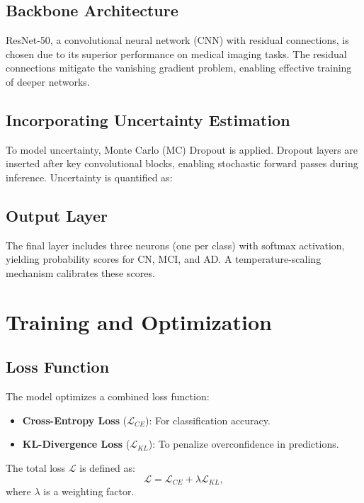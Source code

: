 \documentclass[12pt,twocolumn]{report}
\begin{document}
\subsection{Backbone Architecture}
ResNet-50, a convolutional neural network (CNN) with residual connections, is chosen due to its superior performance on medical imaging tasks. The residual connections mitigate the vanishing gradient problem, enabling effective training of deeper networks.

\subsection{Incorporating Uncertainty Estimation}
To model uncertainty, Monte Carlo (MC) Dropout is applied. Dropout layers are inserted after key convolutional blocks, enabling stochastic forward passes during inference. Uncertainty is quantified as:

\subsection{Output Layer}
The final layer includes three neurons (one per class) with softmax activation, yielding probability scores for CN, MCI, and AD. A temperature-scaling mechanism calibrates these scores.

\section{Training and Optimization}

\subsection{Loss Function}
The model optimizes a combined loss function:
\begin{itemize}
    \item \textbf{Cross-Entropy Loss} ($\mathcal{L}_{CE}$): For classification accuracy.
    \item \textbf{KL-Divergence Loss} ($\mathcal{L}_{KL}$): To penalize overconfidence in predictions.
\end{itemize}
The total loss $\mathcal{L}$ is defined as:
\begin{equation}
    \mathcal{L} = \mathcal{L}_{CE} + \lambda \mathcal{L}_{KL},
\end{equation}
where $\lambda$ is a weighting factor.
\end{document}
